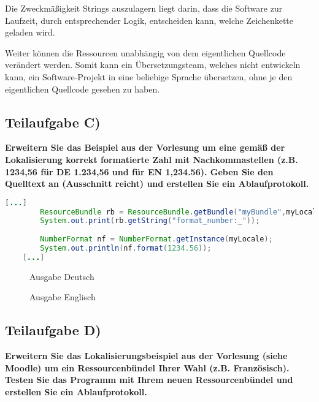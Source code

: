 Die Zweckmäßigkeit Strings auszulagern liegt darin, dass die Software zur
Laufzeit, durch entsprechender Logik, entscheiden kann, welche Zeichenkette
geladen wird.

Weiter können die Ressourcen unabhängig von dem eigentlichen Quellcode verändert
werden. Somit kann ein Übersetzungsteam, welches nicht entwickeln kann, ein
Software-Projekt in eine beliebige Sprache übersetzen, ohne je den eigentlichen
Quellcode gesehen zu haben.


\subsection{Teilaufgabe C)}
\textbf{Erweitern Sie das Beispiel aus der Vorlesung um eine gemäß der Lokalisierung korrekt
formatierte Zahl mit Nachkommastellen (z.B. 1234,56 für DE 1.234,56 und für EN
1,234.56). Geben Sie den Quelltext an (Ausschnitt reicht) und erstellen Sie ein
Ablaufprotokoll.}

\begin{lstlisting}[language=java, style=java, caption={NumberFormat},
label={lst:lst1}]
	[...]
        ResourceBundle rb = ResourceBundle.getBundle("myBundle",myLocale);
        System.out.print(rb.getString("format_number:_"));
        
        NumberFormat nf = NumberFormat.getInstance(myLocale);
        System.out.println(nf.format(1234.56));       
    [...]
\end{lstlisting}
\begin{figure}[htb]
\begin{center}
\caption{Ausgabe Deutsch}
\end{center}
\end{figure}

\begin{figure}[htb]
\begin{center}
\caption{Ausgabe Englisch}
\end{center}
\end{figure}

\clearpage
\subsection{Teilaufgabe D)}
\textbf{Erweitern Sie das Lokalisierungsbeispiel aus der Vorlesung (siehe Moodle) um ein
Ressourcenbündel Ihrer Wahl (z.B. Französisch). Testen Sie das Programm mit Ihrem
neuen Ressourcenbündel und erstellen Sie ein Ablaufprotokoll.}

